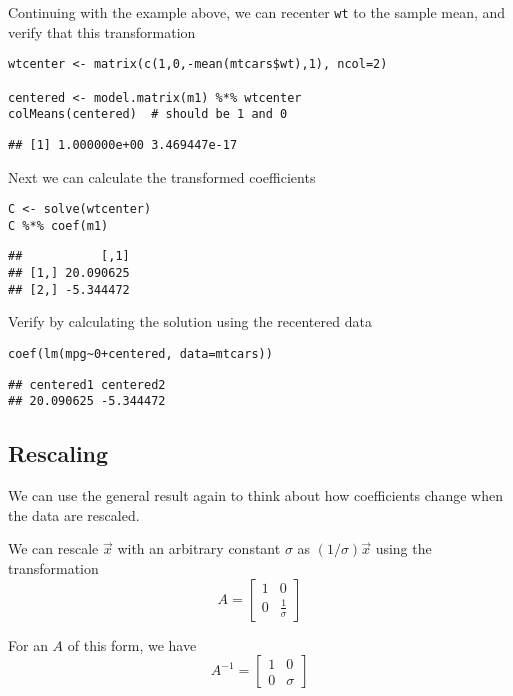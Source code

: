 \documentclass[]{article}
\begin{document}
Continuing with the example above, we can recenter \texttt{wt} to the
sample mean, and verify that this transformation

\begin{verbatim}
wtcenter <- matrix(c(1,0,-mean(mtcars$wt),1), ncol=2)

centered <- model.matrix(m1) %*% wtcenter
colMeans(centered)  # should be 1 and 0
\end{verbatim}

\begin{verbatim}
## [1] 1.000000e+00 3.469447e-17
\end{verbatim}

Next we can calculate the transformed coefficients

\begin{verbatim}
C <- solve(wtcenter)
C %*% coef(m1)
\end{verbatim}

\begin{verbatim}
##           [,1]
## [1,] 20.090625
## [2,] -5.344472
\end{verbatim}

Verify by calculating the solution using the recentered data

\begin{verbatim}
coef(lm(mpg~0+centered, data=mtcars))
\end{verbatim}

\begin{verbatim}
## centered1 centered2 
## 20.090625 -5.344472
\end{verbatim}

\hypertarget{rescaling}{%
\subsection{Rescaling}\label{rescaling}}

We can use the general result again to think about how coefficients
change when the data are rescaled.

We can rescale \(\vec{x}\) with an arbitrary constant \(\sigma\) as
\((1/\sigma)\vec{x}\) using the transformation
\[A=\begin{bmatrix} 1  & 0 \\ 0 & \frac{1}{\sigma} \end{bmatrix}\]

For an \(A\) of this form, we have
\[A^{-1}=\begin{bmatrix} 1  & 0 \\ 0 & \sigma \end{bmatrix}\]
\end{document}
